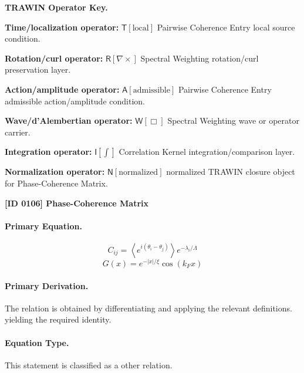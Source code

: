 \par\vspace{0.45\baselineskip}
\noindent\begin{minipage}[t]{\linewidth}
\begingroup
\small
\raggedright
\textbf{TRAWIN Operator Key.}\par
\noindent\textbf{Time/localization operator:} $\mathsf{T}\!\left[\mathrm{local}\right]$ Pairwise Coherence Entry local source condition.\par
\noindent\textbf{Rotation/curl operator:} $\mathsf{R}\!\left[\nabla\times\right]$ Spectral Weighting rotation/curl preservation layer.\par
\noindent\textbf{Action/amplitude operator:} $\mathsf{A}\!\left[\mathrm{admissible}\right]$ Pairwise Coherence Entry admissible action/amplitude condition.\par
\noindent\textbf{Wave/d'Alembertian operator:} $\mathsf{W}\!\left[\Box\right]$ Spectral Weighting wave or operator carrier.\par
\noindent\textbf{Integration operator:} $\mathsf{I}\!\left[\int\right]$ Correlation Kernel integration/comparison layer.\par
\noindent\textbf{Normalization operator:} $\mathsf{N}\!\left[\mathrm{normalized}\right]$ normalized TRAWIN closure object for Phase-Coherence Matrix.\par
\endgroup
\end{minipage}

\clearpage
\noindent\textbf{[ID 0106] Phase-Coherence Matrix}\par
\vspace{0.35em}
\paragraph{Primary Equation.}
\[
C_{ij} = \left\langle e^{i(\theta_i-\theta_j)} \right\rangle e^{-\lambda_i/\Lambda}
\]
\[
G(x)= e^{-\lvert x\rvert/\xi}\cos(k_F x)
\]

\paragraph{Primary Derivation.}
The relation is obtained by differentiating and applying the relevant definitions. yielding the required identity.
\paragraph{Equation Type.}
This statement is classified as a other relation.

